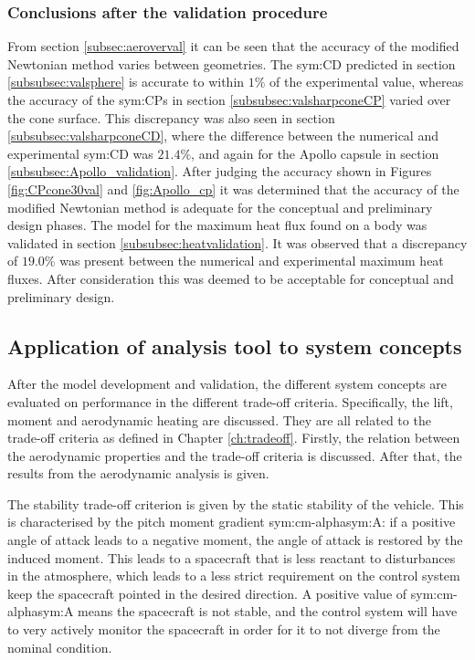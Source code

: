 \subsubsection{Conclusions after the validation procedure}
\label{subsec:validconclusions}
From section \ref{subsec:aeroverval} it can be seen that the accuracy of the modified Newtonian method varies between geometries. The \gls{sym:CD} predicted in section \ref{subsubsec:valsphere} is accurate to within $1\%$ of the experimental value, whereas the accuracy of the \glspl{sym:CP} in section \ref{subsubsec:valsharpconeCP} varied over the cone surface. This discrepancy was also seen in section \ref{subsubsec:valsharpconeCD}, where the difference between the numerical and experimental \gls{sym:CD} was $21.4\%$, and again for the Apollo capsule in section \ref{subsubsec:Apollo_validation}. After judging the accuracy shown in Figures \ref{fig:CPcone30val} and \ref{fig:Apollo_cp} it was determined that the accuracy of the modified Newtonian method is adequate for the conceptual and preliminary design phases.
The model for the maximum heat flux found on a body was validated in section \ref{subsubsec:heatvalidation}. It was observed that a discrepancy of $19.0\%$ was present between the numerical and experimental maximum heat fluxes. After consideration this was deemed to be acceptable for conceptual and preliminary design.

\subsection{Application of analysis tool to system concepts}
\label{subsec:appaeroanal}
After the model development and validation, the different system concepts are evaluated on performance in the different trade-off criteria. Specifically, the lift, moment and aerodynamic heating are discussed. They are all related to the trade-off criteria as defined in Chapter \ref{ch:tradeoff}. Firstly, the relation between the aerodynamic properties and the trade-off criteria is discussed. After that, the results from the aerodynamic analysis is given.

The stability trade-off criterion is given by the static stability of the vehicle. This is characterised by the pitch moment gradient \gls{sym:cm-alpha}\gls{sym:A}: if a positive angle of attack leads to a negative moment, the angle of attack is restored by the induced moment. This leads to a spacecraft that is less reactant to disturbances in the atmosphere, which leads to a less strict requirement on the control system keep the spacecraft pointed in the desired direction. A positive value of \gls{sym:cm-alpha}\gls{sym:A} means the spacecraft is not stable, and the control system will have to very actively monitor the spacecraft in order for it to not diverge from the nominal condition.

